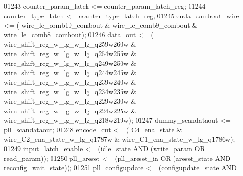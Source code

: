 \begin{DoxyCode}
{01243     \textcolor{vhdlchar}{counter_param_latch} \textcolor{vhdlchar}{<=} \textcolor{vhdlchar}{counter_param_latch_reg};
01244     \textcolor{vhdlchar}{counter_type_latch} \textcolor{vhdlchar}{<=} \textcolor{vhdlchar}{counter_type_latch_reg};
01245     \textcolor{vhdlchar}{cuda_combout_wire} \textcolor{vhdlchar}{<=} \textcolor{vhdlchar}{(} \textcolor{vhdlchar}{wire_le_comb10_combout} \textcolor{vhdlchar}{&} \textcolor{vhdlchar}{wire_le_comb9_combout} \textcolor{vhdlchar}{&} \textcolor{vhdlchar}{
      wire_le_comb8_combout}\textcolor{vhdlchar}{)};
01246     \textcolor{vhdlchar}{data_out} \textcolor{vhdlchar}{<=} \textcolor{vhdlchar}{(} \textcolor{vhdlchar}{wire_shift_reg_w_lg_w_lg_q259w260w} \textcolor{vhdlchar}{&} \textcolor{vhdlchar}{
      wire_shift_reg_w_lg_w_lg_q254w255w} \textcolor{vhdlchar}{&} \textcolor{vhdlchar}{wire_shift_reg_w_lg_w_lg_q249w250w} \textcolor{vhdlchar}{&} \textcolor{vhdlchar}{
      wire_shift_reg_w_lg_w_lg_q244w245w} \textcolor{vhdlchar}{&} \textcolor{vhdlchar}{wire_shift_reg_w_lg_w_lg_q239w240w} \textcolor{vhdlchar}{&} \textcolor{vhdlchar}{
      wire_shift_reg_w_lg_w_lg_q234w235w} \textcolor{vhdlchar}{&} \textcolor{vhdlchar}{wire_shift_reg_w_lg_w_lg_q229w230w} \textcolor{vhdlchar}{&} \textcolor{vhdlchar}{
      wire_shift_reg_w_lg_w_lg_q224w225w} \textcolor{vhdlchar}{&} \textcolor{vhdlchar}{wire_shift_reg_w_lg_w_lg_q218w219w}\textcolor{vhdlchar}{)};
01247     \textcolor{vhdlchar}{dummy_scandataout} \textcolor{vhdlchar}{<=} \textcolor{vhdlchar}{pll_scandataout};
01248     \textcolor{vhdlchar}{encode_out} \textcolor{vhdlchar}{<=} \textcolor{vhdlchar}{(} \textcolor{vhdlchar}{C4_ena_state} \textcolor{vhdlchar}{&} \textcolor{vhdlchar}{wire_C2_ena_state_w_lg_q1787w} \textcolor{vhdlchar}{&} \textcolor{vhdlchar}{
      wire_C1_ena_state_w_lg_q1786w}\textcolor{vhdlchar}{)};
01249     \textcolor{vhdlchar}{input_latch_enable} \textcolor{vhdlchar}{<=} \textcolor{vhdlchar}{(}\textcolor{vhdlchar}{idle_state} \textcolor{keywordflow}{AND} \textcolor{vhdlchar}{(}\textcolor{vhdlchar}{write_param} \textcolor{keywordflow}{OR} \textcolor{vhdlchar}{read_param}\textcolor{vhdlchar}{)}\textcolor{vhdlchar}{)};
01250     \textcolor{vhdlchar}{pll_areset} \textcolor{vhdlchar}{<=} \textcolor{vhdlchar}{(}\textcolor{vhdlchar}{pll_areset_in} \textcolor{keywordflow}{OR} \textcolor{vhdlchar}{(}\textcolor{vhdlchar}{areset_state} \textcolor{keywordflow}{AND} \textcolor{vhdlchar}{reconfig_wait_state}\textcolor{vhdlchar}{)}\textcolor{vhdlchar}{)};
01251     \textcolor{vhdlchar}{pll_configupdate} \textcolor{vhdlchar}{<=} \textcolor{vhdlchar}{(}\textcolor{vhdlchar}{configupdate_state} \textcolor{keywordflow}{AND} \textcolor{vhdlchar}{
}}
\end{DoxyCode}
